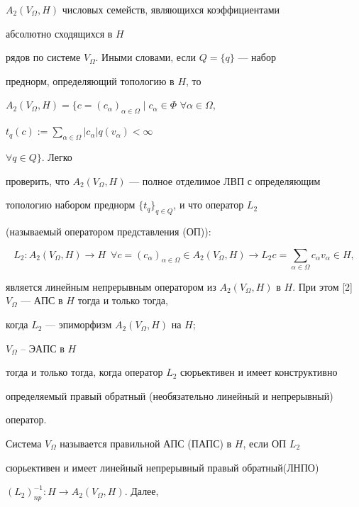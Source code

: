 $A_2(V_{\Omega}, H)$ числовых семейств, являющихся коэффициентами


абсолютно сходящихся в $H$


рядов по системе $V_{\Omega}$. Иными словами, если $Q=\{q\}$ --- набор


преднорм, определяющий топологию в $H$, то


$A_2(V_{\Omega},H)=\Big\{c=(c_{\alpha})_{\alpha\in


\Omega}\mid c_{\alpha}\in\Phi$ $\forall\alpha\in\Omega$,


$t_q(c):=\sum\limits_{\alpha\in\Omega}|c_{\alpha}|q(v_{\alpha})<\infty$


$\forall q\in Q\Big\}$. Легко


проверить, что $A_2(V_{\Omega}, H)$ --- полное отделимое ЛВП с определяющим


топологию набором преднорм $\{t_q\}_{q\in Q}$, и что оператор $L_2$


(называемый оператором представления (ОП)):






$$


L_2:A_2(V_{\Omega},H) \to H\ \; \forall c=(c_{\alpha})_{\alpha\in


\Omega}\in A_2(V_{\Omega}, H)\to


L_2c=\sum\limits_{\alpha\in\Omega}c_{\alpha}


v_{\alpha}\in H,


$$


является линейным непрерывным оператором из $A_2(V_{\Omega},


H)$ в $H$. При этом [2] $V_{\Omega}$ --- АПС в $H$ тогда и только тогда,


когда $L_2$ --- эпиморфизм $A_2(V_{\Omega}, H)$ на $H$;


$V_{\Omega}$ -- ЭАПС в $H$


тогда и только тогда, когда оператор $L_2$ сюрьективен и имеет конструктивно


определяемый правый обратный  (необязательно линейный и непрерывный)


оператор.


Система $V_{\Omega}$ называется правильной АПС (ПАПС) в $H$, если ОП $L_2$


сюрьективен и имеет линейный непрерывный правый обратный\linebreak (ЛНПО)


$(L_2)^{-1}_{np}:H\to A_2(V_{\Omega}, H)$. Далее,


